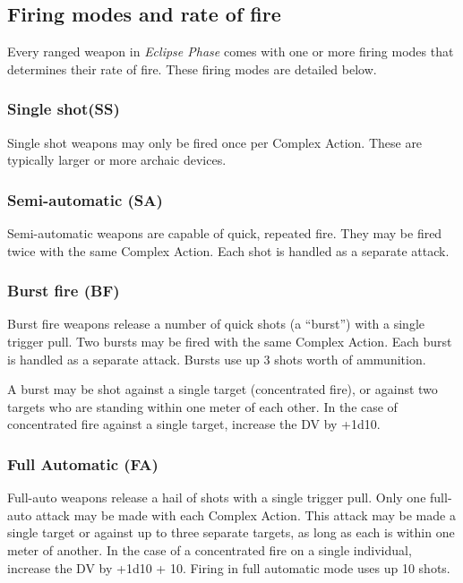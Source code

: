 \subsection{Firing modes and rate of fire}
\label{sec:firing-modes-rate}

Every ranged weapon in \emph{Eclipse Phase} comes with one or more firing modes that determines their rate of fire. These firing modes are detailed below.

\subsubsection{Single shot(SS)}

Single shot weapons may only be fired once per Complex Action. These are typically larger or more archaic devices.

\subsubsection{Semi-automatic (SA)}

Semi-automatic weapons are capable of quick, repeated fire. They may be fired twice with the same Complex Action. Each shot is handled as a separate attack.

\subsubsection{Burst fire (BF)}

Burst fire weapons release a number of quick shots (a ``burst”) with a single trigger pull. Two bursts may be fired with the same Complex Action. Each burst is handled as a separate attack. Bursts use up 3 shots worth of ammunition.

A burst may be shot against a single target (concentrated fire), or against two targets who are standing within one meter of each other. In the case of concentrated fire against a single target, increase the DV by +1d10.

\subsubsection{Full Automatic (FA)}

Full-auto weapons release a hail of shots with a single trigger pull. Only one full-auto attack may be made with each Complex Action. This attack may be made a single target or against up to three separate targets, as long as each is within one meter of another. In the case of a concentrated fire on a single individual, increase the DV by +1d10 + 10. Firing in full automatic mode uses up 10 shots.


